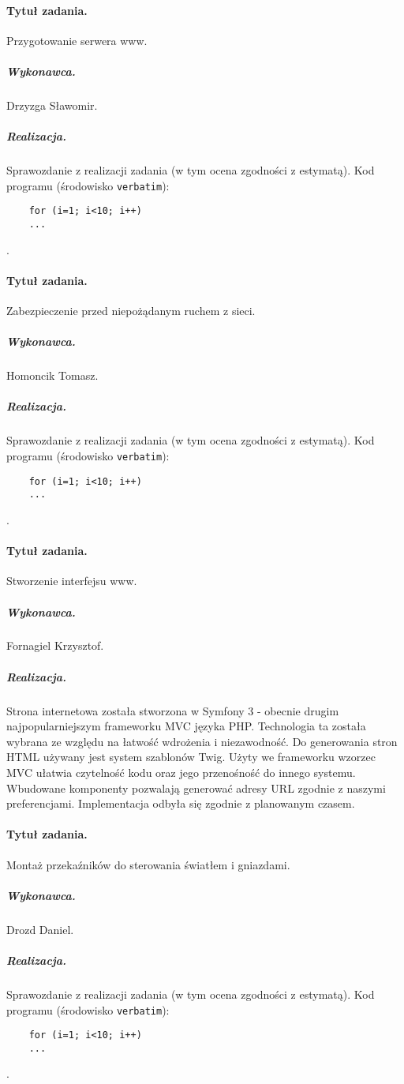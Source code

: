 	\paragraph{Tytuł zadania.} Przygotowanie serwera www.
	\subparagraph{Wykonawca.} Drzyzga Sławomir.
	\subparagraph{Realizacja.} Sprawozdanie z realizacji zadania (w tym ocena zgodności z estymatą). Kod programu (środowisko \texttt{verbatim}): \begin{verbatim}
	for (i=1; i<10; i++)
	...
	\end{verbatim}.
	
	\paragraph{Tytuł zadania.} Zabezpieczenie przed niepożądanym ruchem z sieci.
	\subparagraph{Wykonawca.} Homoncik Tomasz.
	\subparagraph{Realizacja.} Sprawozdanie z realizacji zadania (w tym ocena zgodności z estymatą). Kod programu (środowisko \texttt{verbatim}): \begin{verbatim}
	for (i=1; i<10; i++)
	...
	\end{verbatim}.
	
	\paragraph{Tytuł zadania.} Stworzenie interfejsu www.
	\subparagraph{Wykonawca.} Fornagiel Krzysztof.
	\subparagraph{Realizacja.} 
	Strona internetowa została stworzona w Symfony 3 - obecnie drugim najpopularniejszym frameworku MVC języka PHP. Technologia ta została wybrana ze względu na łatwość wdrożenia i niezawodność. Do generowania stron HTML używany jest system szablonów Twig. Użyty we frameworku wzorzec MVC ułatwia czytelność kodu oraz jego przenośność do innego systemu. Wbudowane komponenty pozwalają generować adresy URL zgodnie z naszymi preferencjami. Implementacja odbyła się zgodnie z planowanym czasem. 

	\paragraph{Tytuł zadania.} Montaż przekaźników do sterowania światłem i gniazdami.
	\subparagraph{Wykonawca.} Drozd Daniel.
	\subparagraph{Realizacja.} Sprawozdanie z realizacji zadania (w tym ocena zgodności z estymatą). Kod programu (środowisko \texttt{verbatim}): \begin{verbatim}
	for (i=1; i<10; i++)
	...
	\end{verbatim}.
	
